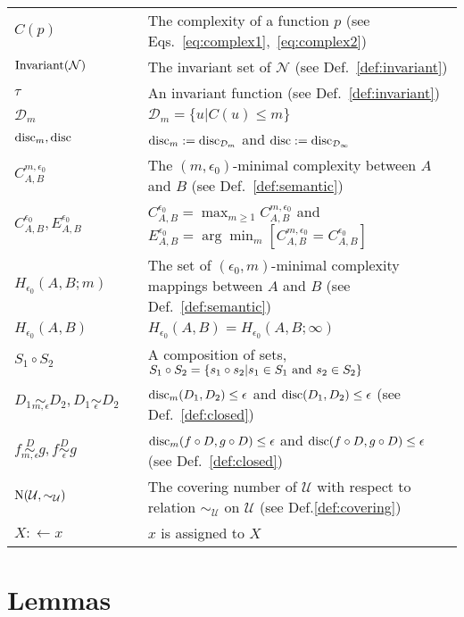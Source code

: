 \documentclass{article} %
\newcommand{\disc}{\textnormal{disc}}
\newcommand{\Inv}{\textnormal{Invariant}}
\newcommand{\Cov}{\textnormal{N}}
\begin{document}
\begin{table}[htbp]
\begin{center}
\begin{tabular}{l c p{10cm} }
$C(p)$ &  & The complexity of a function $p$ (see Eqs.~\ref{eq:complex1},~\ref{eq:complex2})\\
$\Inv(\mathcal{N})$ & & The invariant set of $\mathcal{N}$ (see Def.~\ref{def:invariant})\\
$\tau$& & An invariant function (see Def.~\ref{def:invariant})\\
$\mathcal{D}_m$ & & $\mathcal{D}_m = \{u \vert C(u) \leq m\}$\\
$\disc_m , \disc$ & & $\disc_m := \disc_{\mathcal{D}_m}$ and $\disc := \disc_{\mathcal{D}_\infty}$\\
$C^{m,\epsilon_0}_{A,B}$ & & The $(m,\epsilon_0)$-minimal complexity between $A$ and $B$ (see Def.~\ref{def:semantic})\\
$C^{\epsilon_0}_{A,B},E^{\epsilon_0}_{A,B}$ & & $C^{\epsilon_0}_{A,B} = \max_{m \geq 1} C^{m,\epsilon_0}_{A,B}$ and $E^{\epsilon_0}_{A,B} =\arg\min_m [C^{m,\epsilon_0}_{A,B} = C^{\epsilon_0}_{A,B}]$\\
$H_{\epsilon_0}(A,B;m)$ & & The set of $(\epsilon_0,m)$-minimal complexity mappings between $A$ and $B$ (see Def.~\ref{def:semantic})\\
$H_{\epsilon_0}(A,B)$ & & $H_{\epsilon_0}(A,B) = H_{\epsilon_0}(A,B;\infty)$\\
$S_1 \circ S_2$ & & A composition of sets, $S_1 \circ S_2 = \{s_1\circ s_2 | s_1 \in S_1 \textnormal{ and } s_2 \in S_2\}$ \\
$D_1 \underset{m,\epsilon}{\sim} D_2, D_1 \underset{\epsilon}{\sim} D_2$ & & $\disc_m(D_1,D_2) \leq \epsilon$ and $\disc(D_1,D_2) \leq \epsilon$ (see Def.~\ref{def:closed})\\
$f \overset{D}{\underset{m,\epsilon}{\sim}} g, f \overset{D}{\underset{\epsilon}{\sim}} g $ & & $\disc_m(f \circ D,g\circ D) \leq \epsilon$ and $\disc(f \circ D,g\circ D) \leq \epsilon$ (see Def.~\ref{def:closed})\\
$\Cov(\mathcal{U},\sim_{\mathcal{U}})$ & & The covering number of $\mathcal{U}$ with respect to relation $\sim_{\mathcal{U}}$ on $\mathcal{U}$ (see Def.\ref{def:covering})\\
$X :\leftarrow x$ & & $x$ is assigned to $X$ \\
\bottomrule
\end{tabular}
\end{center}
\label{tab:TableOfNotationForMyResearch}
\end{table}
\newpage

\section{Lemmas}
\end{document}
